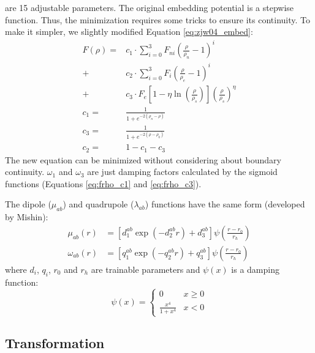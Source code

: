 \documentclass[prb,reprint]{revtex4-2}
\begin{document}
are 15 adjustable parameters. The original embedding potential is a stepwise 
function. Thus, the minimization requires some tricks to ensure its continuity.
To make it simpler, we slightly modified Equation \ref{eq:zjw04_embed}:
\begin{align}
\label{eq:zjw04xc_embed}
F(\rho) 
= & c_1 \cdot
\sum_{i=0}^{3}{F_{ni}\left( \frac{\rho}{\rho_n} - 1 \right)^{i}} \nonumber \\
+ & c_2 \cdot 
\sum_{i=0}^{3}{F_{i}\left( \frac{\rho}{\rho_e} - 1 \right)^{i}} \nonumber \\
+ & c_3 \cdot
F_{e}\left[1 - \eta\ln\left( \frac{\rho}{\rho_s}\right)\right]
(\frac{\rho}{\rho_s})^{\eta} \\
\label{eq:frho_c1}
c_{1} = & \frac{1}{1 + e^{-2\left(\rho_{n} - \rho\right)}} \\
\label{eq:frho_c3}
c_{3} = & \frac{1}{1 + e^{-2\left(\rho - \rho_{0}\right)}} \\
c_{2} = & 1 - c_1 - c_3
\end{align}
The new equation can be minimized without considering about boundary continuity.
$\omega_1$ and $\omega_3$ are just damping factors calculated by the sigmoid 
functions (Equations \ref{eq:frho_c1} and \ref{eq:frho_c3}).

The dipole ($\mu_{ab}$) and quadrupole ($\lambda_{ab}$) functions have the same 
form (developed by Mishin):
\begin{align}
\label{eq:adp_dipole}
\mu_{ab}(r) & = \left[
    d_{1}^{ab} \exp\left( -d_{2}^{ab}r \right) + d_{3}^{ab}
\right] \psi\left( \frac{r - r_{0}}{r_{h}} \right) \\
\omega_{ab}(r) & = \left[
    q_{1}^{ab} \exp\left( -q_{2}^{ab}r \right) + q_{3}^{ab}
\right] \psi\left( \frac{r - r_{0}}{r_{h}} \right)
\end{align}
where $d_{i}$, $q_{i}$, $r_0$ and $r_{h}$ are trainable parameters and $\psi(x)$
is a damping function:
\begin{equation}
\label{eq:mishin_cutoff}
\psi(x) = \begin{cases}
    0 & x \ge 0 \\
    \frac{x^4}{1 + x^4} & x < 0 
\end{cases}
\end{equation}

\subsection{Transformation}
\label{sec:transformation}
\end{document}
